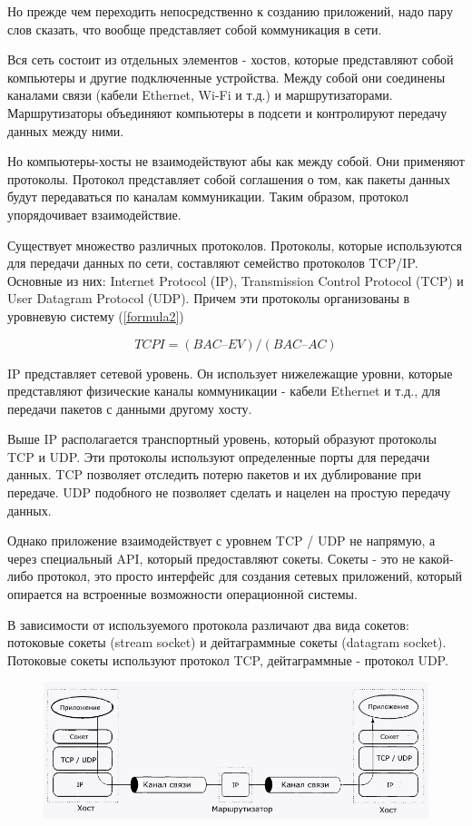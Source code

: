 \documentclass[a4paper, 12pt]{report}
\begin{document}
	Но прежде чем переходить непосредственно к созданию приложений, надо пару слов сказать, что вообще представляет собой коммуникация в сети.
	
	Вся сеть состоит из отдельных элементов - хостов, которые представляют собой компьютеры и другие подключенные устройства. Между собой они соединены каналами связи (кабели Ethernet, Wi-Fi и т.д.) и маршрутизаторами. Маршрутизаторы объединяют компьютеры в подсети и контролируют передачу данных между ними.
	
	Но компьютеры-хосты не взаимодействуют абы как между собой. Они применяют протоколы. Протокол представляет собой соглашения о том, как пакеты данных будут передаваться по каналам коммуникации. Таким образом, протокол упорядочивает взаимодействие.
	
	Существует множество различных протоколов. Протоколы, которые используются для передачи данных по сети, составляют семейство протоколов TCP/IP. Основные из них: Internet Protocol (IP), Transmission Control Protocol (TCP) и User Datagram Protocol (UDP). Причем эти протоколы организованы в уровневую систему (\ref{formula2})
	
	\begin{equation}
		TCPI = (BAC – EV)/(BAC – AC)
		\label{formula2}
	\end{equation}
	
	
	IP представляет сетевой уровень. Он использует нижележащие уровни, которые представляют физические каналы коммуникации - кабели Ethernet и т.д., для передачи пакетов с данными другому хосту. \cite{фунтов2021основы}
	
	Выше IP располагается транспортный уровень, который образуют протоколы TCP и UDP. Эти протоколы используют определенные порты для передачи данных. TCP позволяет отследить потерю пакетов и их дублирование при передаче. UDP подобного не позволяет сделать и нацелен на простую передачу данных.
	
	Однако приложение взаимодействует с уровнем TCP / UDP не напрямую, а через специальный API, который предоставляют сокеты. Сокеты - это не какой-либо протокол, это просто интерфейс для создания сетевых приложений, который опирается на встроенные возможности операционной системы.
	
	В зависимости от используемого протокола различают два вида сокетов: потоковые сокеты (stream socket) и дейтаграммные сокеты (datagram socket). Потоковые сокеты используют протокол TCP, дейтаграммные - протокол UDP.
	
	 \begin{figure}[h]
		
		\centering
		\includegraphics[width=0.5\linewidth]{protocols.png}
		
	\end{figure}
	
\end{document}
